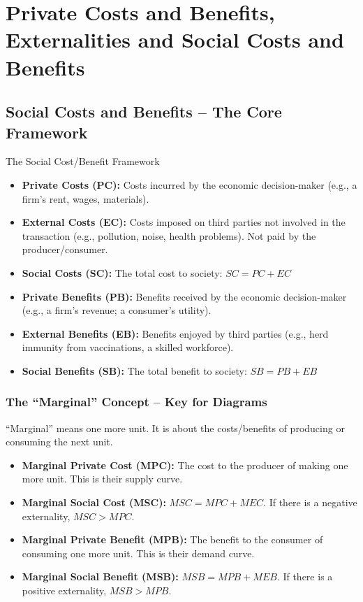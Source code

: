 \documentclass[11pt, a4paper, twoside]{book}
\begin{document}
\section{Private Costs and Benefits, Externalities and Social Costs and Benefits}

\subsection{Social Costs and Benefits -- The Core Framework}

\begin{keyterm}{The Social Cost/Benefit Framework}
\begin{itemize}
  \item \textbf{Private Costs (PC):} Costs incurred by the economic decision-maker (e.g., a firm's rent, wages, materials).
  \item \textbf{External Costs (EC):} Costs imposed on third parties not involved in the transaction (e.g., pollution, noise, health problems). Not paid by the producer/consumer.
  \item \textbf{Social Costs (SC):} The total cost to society: $SC = PC + EC$
  \item \textbf{Private Benefits (PB):} Benefits received by the economic decision-maker (e.g., a firm's revenue; a consumer's utility).
  \item \textbf{External Benefits (EB):} Benefits enjoyed by third parties (e.g., herd immunity from vaccinations, a skilled workforce).
  \item \textbf{Social Benefits (SB):} The total benefit to society: $SB = PB + EB$
\end{itemize}
\end{keyterm}

\subsubsection{The ``Marginal'' Concept -- Key for Diagrams}

``Marginal'' means one more unit. It is about the costs/benefits of producing or consuming the next unit.

\begin{itemize}
  \item \textbf{Marginal Private Cost (MPC):} The cost to the producer of making one more unit. This is their supply curve.
  \item \textbf{Marginal Social Cost (MSC):} $MSC = MPC + MEC$. If there is a negative externality, $MSC > MPC$.
  \item \textbf{Marginal Private Benefit (MPB):} The benefit to the consumer of consuming one more unit. This is their demand curve.
  \item \textbf{Marginal Social Benefit (MSB):} $MSB = MPB + MEB$. If there is a positive externality, $MSB > MPB$.
\end{itemize}
\end{document}

